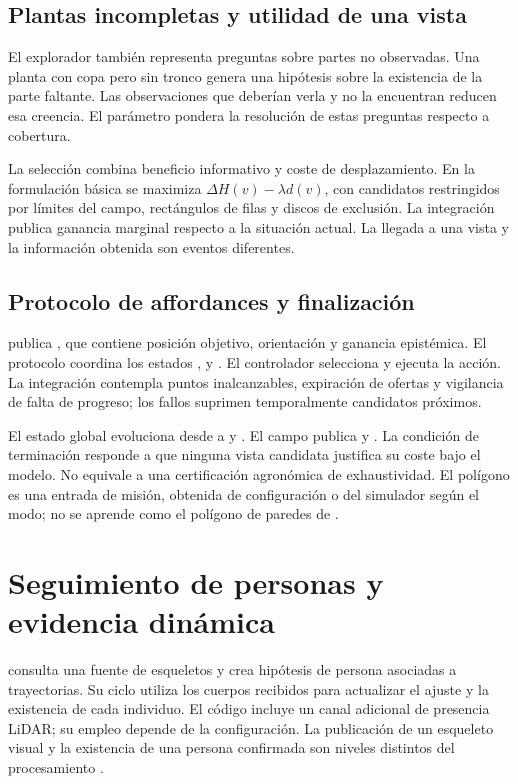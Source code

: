 \subsection{Plantas incompletas y utilidad de una vista}
El explorador también representa preguntas sobre partes no observadas. Una planta con copa pero sin tronco genera una hipótesis sobre la existencia de la parte faltante. Las observaciones que deberían verla y no la encuentran reducen esa creencia. El parámetro  pondera la resolución de estas preguntas respecto a cobertura.

La selección combina beneficio informativo y coste de desplazamiento. En la formulación básica se maximiza $\Delta H(v)-\lambda d(v)$, con candidatos restringidos por límites del campo, rectángulos de filas y discos de exclusión. La integración publica ganancia marginal respecto a la situación actual. La llegada a una vista y la información obtenida son eventos diferentes.

\subsection{Protocolo de affordances y finalización}
 publica , que contiene posición objetivo, orientación y ganancia epistémica. El protocolo coordina los estados ,  y . El controlador selecciona y ejecuta la acción. La integración contempla puntos inalcanzables, expiración de ofertas y vigilancia de falta de progreso; los fallos suprimen temporalmente candidatos próximos.

El estado global evoluciona desde  a  y . El campo publica  y . La condición de terminación responde a que ninguna vista candidata justifica su coste bajo el modelo. No equivale a una certificación agronómica de exhaustividad. El polígono es una entrada de misión, obtenida de configuración o del simulador según el modo; no se aprende como el polígono de paredes de .

\section{Seguimiento de personas y evidencia dinámica}
 consulta una fuente de esqueletos y crea hipótesis de persona asociadas a trayectorias. Su ciclo utiliza los cuerpos recibidos para actualizar el ajuste y la existencia de cada individuo. El código incluye un canal adicional de presencia LiDAR; su empleo depende de la configuración. La publicación de un esqueleto visual y la existencia de una persona confirmada son niveles distintos del procesamiento \cite{humans}.


